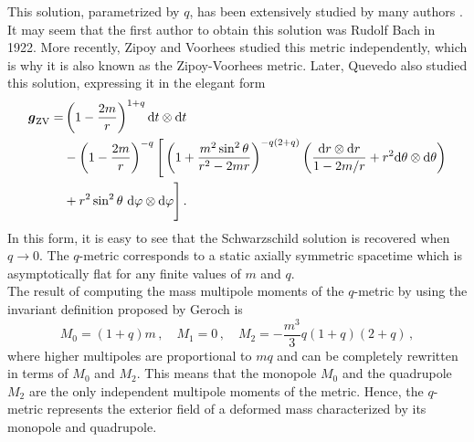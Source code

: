 \documentclass[12pt]{article}
\def\be{\begin{equation}}
\def\ee{\end{equation}}
\newcommand{\rob}[1]{\left(#1\right)}    %
\newcommand{\sqb}[1]{\left[#1\right]}    %
\newcommand{\mbi}[1]{\boldsymbol{#1}}    %
\newcommand{\tprod}[2]{{\rm d}#1 \otimes {\rm d} #2}
\begin{document}
This solution, parametrized by $q$, has been extensively studied by many authors \cite{bach1922neue, darmois1927memorial, zipoy1966topology, gautreau1967directional, bonnor1968interpretation, voorhees1970static, esposito1975static,  kodama2003global, quevedo2011mass}. It may seem that the first author to obtain this solution was Rudolf Bach \cite{bach1922neue} in 1922. More recently, Zipoy \cite{zipoy1966topology} and Voorhees \cite{voorhees1970static} studied this metric independently, which is why it is also known as the Zipoy-Voorhees metric. Later, Quevedo \cite{quevedo2011mass} also studied this solution, expressing it in the elegant form
\begin{align}
	\mbi{g}_{\rm ZV} =& \rob{1-\frac{2m}{r}}^{1+q}\tprod{t}{t}\notag \\
	&-\rob{1-\frac{2m}{r}}^{-q}\Bigg[ \rob{1+\frac{m^2 \sin^2\theta}{r^2-2mr}}^{-q(2+q)}\rob{\frac{\tprod{r}{r}}{1-2m/r}+r^2\tprod{\theta}{\theta}} \notag \\
	&+r^2\sin^2\theta\,\, \tprod{\varphi}{\varphi}\Bigg]\,.
\end{align}
In this form, it is easy to see that the Schwarzschild solution is recovered when $q\to 0$. The $q$-metric corresponds to a static axially symmetric spacetime which is asymptotically flat for any finite values of $m$ and $q$. \\

The result of computing the mass multipole moments of the $q$-metric by using the invariant definition proposed by Geroch \cite{geroch1970a, geroch1970b} is 
\be 
	M_0=(1+q)m\,, \quad M_1=0\,, \quad M_2 = -\frac{m^3}{3}q(1+q)(2+q)\,,
\ee
where higher multipoles are proportional to $mq$ and can be completely rewritten in terms of $M_0$ and $M_2$. This means that the monopole $M_0$ and the quadrupole $M_2$ are the only independent multipole moments of the metric. Hence, the $q$-metric represents the exterior field of a deformed mass characterized by its monopole and quadrupole.\\
\end{document}
